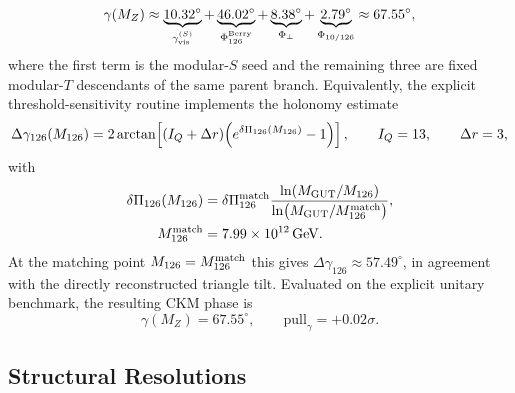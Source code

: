 \documentclass[11pt]{article}
\begin{document}
\begin{equation}
 \gamma(M_Z)
 \approx
 \underbrace{10.32^{\circ}}_{\gamma_{\rm vis}^{(S)}}
 +
 \underbrace{46.02^{\circ}}_{\Phi_{126}^{\rm Berry}}
 +
 \underbrace{8.38^{\circ}}_{\Phi_{\perp}}
 +
 \underbrace{2.79^{\circ}}_{\Phi_{10/126}}
 \approx 67.55^{\circ},
\end{equation}
where the first term is the modular-$S$ seed and the remaining three are fixed modular-$T$ descendants of the same parent branch.
Equivalently, the explicit threshold-sensitivity routine implements the holonomy estimate
\begin{equation}
 \Delta\gamma_{126}(M_{126})
 =
 2\arctan\!\left[(I_Q+\Delta r)\Bigl(e^{\delta\Pi_{126}(M_{126})}-1\Bigr)\right],
 \qquad
 I_Q=13,
 \qquad
 \Delta r=3,
\end{equation}
with
\begin{align}
 \delta\Pi_{126}(M_{126})
 &=
 \delta\Pi_{126}^{\rm match}
 \frac{\ln(M_{\rm GUT}/M_{126})}{\ln(M_{\rm GUT}/M_{126}^{\rm match})}, \\
 M_{126}^{\rm match}
 &= 7.99\times10^{12}\,\mathrm{GeV}.
\end{align}
At the matching point $M_{126}=M_{126}^{\rm match}$ this gives $\Delta\gamma_{126}\approx57.49^{\circ}$, in agreement with the directly reconstructed triangle tilt. Evaluated on the explicit unitary benchmark, the resulting CKM phase is
\begin{equation}
 \gamma(M_Z)=67.55^{\circ},
 \qquad
 \mathrm{pull}_{\gamma}=+0.02\sigma.
\end{equation}

\subsection{Structural Resolutions}
\end{document}
